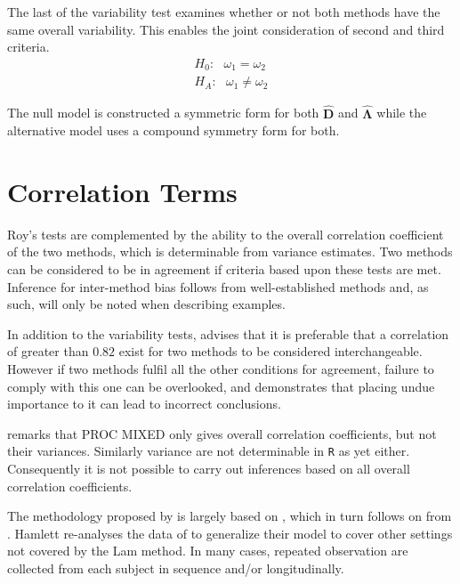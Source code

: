 \documentclass[12pt, a4paper]{report}
\theoremstyle{plain}
\theoremstyle{definition}
\theoremstyle{remark}
\begin{document}
	The last of the variability test examines whether or not both methods have the same overall variability. This enables the joint consideration of second and third criteria.
	\begin{eqnarray*}
		H_{0}: \mbox{ }\omega_{1}  = \omega_{2} \\
		H_{A}: \mbox{ }\omega_{1}  \neq \omega_{2}
	\end{eqnarray*}
	
	The null model is constructed a symmetric form for both $\boldsymbol{\hat{D}}$ and $\boldsymbol{\hat{\Lambda}}$ while the alternative model uses a compound symmetry form for both.
	
	

	


	
\section{Correlation Terms}
	
Roy's tests are complemented by the ability to the overall correlation coefficient of the two methods, which is determinable from variance estimates. Two methods can be considered to be in agreement if criteria based upon these tests are met. Inference for inter-method bias follows from well-established methods and, as such, will only be noted when describing examples.
	
	
In addition to the variability tests, \citet{ARoy2009} advises that it is preferable that a correlation of greater than $0.82$ exist for two methods to be considered interchangeable. However if two methods fulfil all the other conditions for agreement, failure to comply with this one can be overlooked, and demonstrates that placing undue importance to it can lead to incorrect conclusions.
	
\citet{ARoy2009} remarks that PROC MIXED only gives overall correlation coefficients, but not their variances. Similarly variance are not determinable in \texttt{R} as yet either. Consequently it is not possible to carry out inferences based on all overall correlation coefficients.
	
	
	
	


The methodology proposed by \citet{ARoy2009} is largely based on \citet{hamlett}, which in turn follows on from \citet{lam}. Hamlett re-analyses the data of \citet{lam} to generalize their model to cover other settings not covered by the Lam method. In many cases, repeated observation are collected from each subject in sequence  and/or longitudinally.
\end{document}
